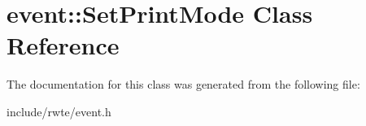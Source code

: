 \hypertarget{classevent_1_1SetPrintMode}{}\section{event\+::Set\+Print\+Mode Class Reference}
\label{classevent_1_1SetPrintMode}


The documentation for this class was generated from the following file\+:\begin{DoxyCompactItemize}
\item 
include/rwte/event.\+h\end{DoxyCompactItemize}
